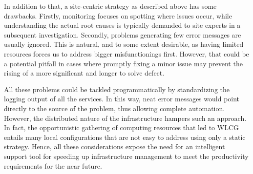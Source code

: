 In addition to that, a site-centric strategy as described above has some drawbacks. Firstly, monitoring focuses on spotting where issues occur, while understanding the actual root causes is typically demanded to site experts in a subsequent investigation.
Secondly, problems generating few error messages are usually ignored. This is natural, and to some extent desirable, as having limited resources forces us to address bigger misfunctionings first. However, that could be a potential pitfall in cases where promptly fixing a minor issue may prevent the rising of a more significant and longer to solve defect.

All these problems could be tackled programmatically by standardizing the logging output of all the services. In this way, neat error messages would point directly to the source of the problem, thus allowing complete automation. 
However, the distributed nature of the infrastructure hampers such an approach.
In fact, the opportunistic gathering of computing resources that led to WLCG entails many local configurations that are not easy to address using only a static strategy.
Hence, all these considerations expose the need for an intelligent support tool for speeding up infrastructure management to meet the productivity requirements for the near future.

